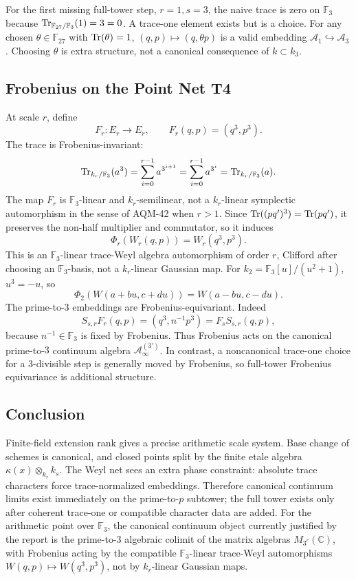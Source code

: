 For the first missing full-tower step, \(r=1,s=3\), the naive trace is zero on
\(\mathbb F_3\) because \(\operatorname{Tr}_{\mathbb F_{27}/\mathbb F_3}(1)=3=0\).  A
trace-one element exists but is a choice.  For any chosen \(\theta\in
\mathbb F_{27}\) with \(\operatorname{Tr}(\theta)=1\), \((q,p)\mapsto(q,\theta p)\) is a
valid embedding \(\mathcal A_1\hookrightarrow\mathcal A_3\).  Choosing
\(\theta\) is extra structure, not a canonical consequence of \(k\subset k_3\).

\subsection{Frobenius on the Point Net T4}

At scale \(r\), define
\[
  F_r:E_r\to E_r,\qquad F_r(q,p)=(q^3,p^3).
\]
The trace is Frobenius-invariant:
\[
  \operatorname{Tr}_{k_r/\mathbb F_3}(a^3)=
  \sum_{i=0}^{r-1}a^{3^{i+1}}=\sum_{i=0}^{r-1}a^{3^i}
  =\operatorname{Tr}_{k_r/\mathbb F_3}(a).
\]
The map \(F_r\) is \(\mathbb F_3\)-linear and \(k_r\)-semilinear, not a
\(k_r\)-linear symplectic automorphism in the sense of AQM-42 when \(r>1\).
Since \(\operatorname{Tr}((p q')^3)=\operatorname{Tr}(p q')\), it preserves the non-half multiplier and
commutator, so it induces
\[
  \Phi_r(W_r(q,p))=W_r(q^3,p^3).
\]
This is an \(\mathbb F_3\)-linear trace-Weyl algebra automorphism of order
\(r\), Clifford after choosing an \(\mathbb F_3\)-basis, not a \(k_r\)-linear
Gaussian map.  For \(k_2=\mathbb F_3[u]/(u^2+1)\), \(u^3=-u\), so
\[
  \Phi_2(W(a+bu,c+du))=W(a-bu,c-du).
\]
The prime-to-\(3\) embeddings are Frobenius-equivariant.  Indeed
\[
  S_{s,r}F_r(q,p)=(q^3,n^{-1}p^3)
  =
  F_sS_{s,r}(q,p),
\]
because \(n^{-1}\in\mathbb F_3\) is fixed by Frobenius.  Thus Frobenius acts
on the canonical prime-to-\(3\) continuum algebra
\(\mathcal A_{\infty}^{(3')}\).  In contrast, a noncanonical trace-one choice
for a \(3\)-divisible step is generally moved by Frobenius, so full-tower
Frobenius equivariance is additional structure.

\subsection{Conclusion}

Finite-field extension rank gives a precise arithmetic scale system.  Base
change of schemes is canonical, and closed points split by the finite
etale algebra \(\kappa(x)\otimes_{k_r}k_s\).  The Weyl net sees an extra
phase constraint: absolute trace characters force trace-normalized embeddings.
Therefore canonical continuum limits exist immediately on the prime-to-\(p\)
subtower; the full tower exists only after coherent trace-one or compatible
character data are added.  For the arithmetic point over \(\mathbb F_3\), the
canonical continuum object currently justified by the report is the
prime-to-\(3\) algebraic colimit of the matrix algebras \(M_{3^r}(\mathbb C)\),
with Frobenius acting by the compatible \(\mathbb F_3\)-linear trace-Weyl
automorphisms \(W(q,p)\mapsto W(q^3,p^3)\), not by \(k_r\)-linear Gaussian maps.
